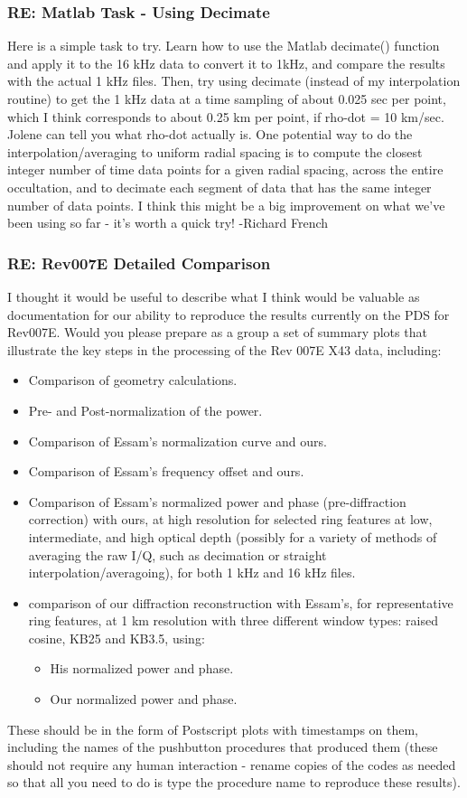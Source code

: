 \documentclass[crop=false,class=book]{standalone}
\begin{document}
\subsubsection{\footnotesize RE: Matlab Task - Using Decimate}
Here is a simple task to try. Learn how to use the Matlab decimate() function and apply it to the 16 kHz data to convert it to 1kHz, and compare the results with the actual 1 kHz files. Then, try using decimate (instead of my interpolation routine) to get the 1 kHz data at a time sampling of about 0.025 sec per point, which I think corresponds to about 0.25 km per point, if rho-dot = 10 km/sec. Jolene can tell you what rho-dot actually is. One potential way to do the interpolation/averaging to uniform radial spacing is to compute the closest integer number of time data points for a given radial spacing, across the entire occultation, and to decimate each segment of data that has the same integer number of data points. I think this might be a big improvement on what we've been using so far - it's worth a quick try! -Richard French
\subsubsection{\footnotesize RE: Rev007E Detailed Comparison}
I thought it would be useful to describe what I think would be valuable as documentation for our ability to reproduce the results currently on the PDS for Rev007E. Would you please prepare as a group a set of summary plots that illustrate the key steps in the processing of the Rev 007E X43 data, including:
\begin{itemize}
    \item Comparison of geometry calculations.
    \item Pre- and Post-normalization of the power.
    \item Comparison of Essam's normalization curve and ours.
    \item Comparison of Essam's frequency offset and ours.
    \item Comparison of Essam's normalized power and phase (pre-diffraction correction) with ours, at high resolution for selected ring features at low, intermediate, and high optical depth (possibly for a variety of methods of averaging the raw I/Q, such as decimation or straight interpolation/averagoing), for both 1 kHz and 16 kHz files.
    \item comparison of our diffraction reconstruction with Essam's, for representative ring features, at 1 km resolution with three different window types: raised cosine, KB25 and KB3.5, using:
    \begin{itemize}
        \item His normalized power and phase.
        \item Our normalized power and phase.
    \end{itemize}
\end{itemize}
These should be in the form of Postscript plots with timestamps on them, including the names of the pushbutton procedures that produced them (these should not require any human interaction - rename copies of the codes as needed so that all you need to do is type the procedure name to reproduce these results).
\end{document}
